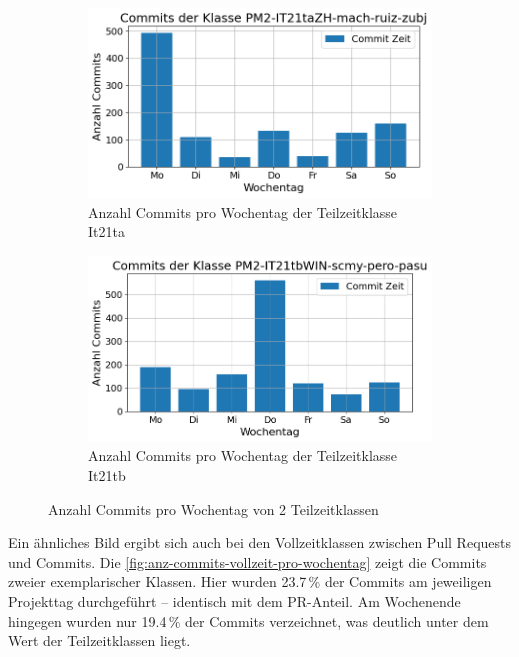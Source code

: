 \begin{figure}[htbp]
    \centering
    \begin{subfigure}[b]{0.48\textwidth}
        \centering
        \includegraphics[width=\textwidth]{Figures/commits-klasse-per-wochentag-21ta.png}
         \caption{Anzahl Commits pro Wochentag der Teilzeitklasse It21ta}
        \label{fig:anzahl-commits-pro-wochentag-it21ta}
    \end{subfigure}
    \hfill
    \begin{subfigure}[b]{0.48\textwidth}
        \centering
        \includegraphics[width=\textwidth]{Figures/commits-klasse-per-wochentag-21tb.png}
         \caption{Anzahl Commits pro Wochentag der Teilzeitklasse It21tb}
        \label{fig:anzahl-commits-pro-wochentag-it21tb}
    \end{subfigure}
    \caption{Anzahl Commits pro Wochentag von 2 Teilzeitklassen}
    \label{fig:anz-commits-teilzeit-pro-wochentag}
\end{figure}

Ein ähnliches Bild ergibt sich auch bei den Vollzeitklassen zwischen Pull Requests und Commits. Die \autoref{fig:anz-commits-vollzeit-pro-wochentag} zeigt die Commits zweier exemplarischer Klassen. Hier wurden 23.7\,\% der Commits am jeweiligen Projekttag durchgeführt – identisch mit dem PR-Anteil. Am Wochenende hingegen wurden nur 19.4\,\% der Commits verzeichnet, was deutlich unter dem Wert der Teilzeitklassen liegt.

